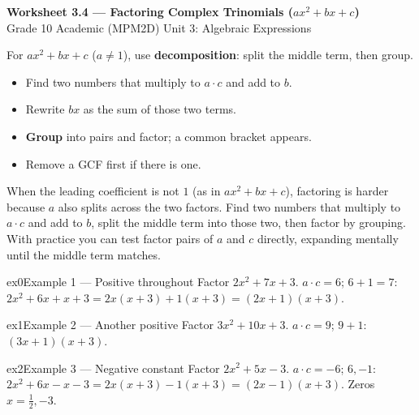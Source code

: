 \documentclass[11pt]{article}
\begin{document}
\begin{center}
{\LARGE\bfseries\color{titleblue}Worksheet 3.4 --- Factoring Complex Trinomials ($ax^2+bx+c$)}\\[2pt]
{\small Grade 10 Academic (MPM2D) \textperiodcentered{} Unit 3: Algebraic Expressions}
\end{center}

\begin{ideabox}
For $ax^2+bx+c$ ($a\neq1$), use \textbf{decomposition}: split the middle term, then group.
\begin{itemize}[leftmargin=*,itemsep=2pt]
  \item Find two numbers that multiply to $a\cdot c$ and add to $b$.
  \item Rewrite $bx$ as the sum of those two terms.
  \item \textbf{Group} into pairs and factor; a common bracket appears.
  \item Remove a GCF first if there is one.
\end{itemize}
\end{ideabox}

\begin{learnbox}
When the leading coefficient is not $1$ (as in $ax^2+bx+c$), factoring is harder because $a$ also splits across the two factors.
Find two numbers that multiply to $a\cdot c$ and add to $b$, split the middle term into those two, then factor by grouping.
With practice you can test factor pairs of $a$ and $c$ directly, expanding mentally until the middle term matches.
\end{learnbox}


\begin{example}{ex0}{Example 1 --- Positive throughout}
Factor $2x^2+7x+3$.
\soln $a\cdot c=6$; $6+1=7$: $2x^2+6x+x+3=2x(x+3)+1(x+3)=(2x+1)(x+3).$
\end{example}

\begin{example}{ex1}{Example 2 --- Another positive}
Factor $3x^2+10x+3$.
\soln $a\cdot c=9$; $9+1$: $(3x+1)(x+3).$
\end{example}

\begin{example}{ex2}{Example 3 --- Negative constant}
Factor $2x^2+5x-3$.
\soln $a\cdot c=-6$; $6,-1$: $2x^2+6x-x-3=2x(x+3)-1(x+3)=(2x-1)(x+3).$ Zeros $x=\tfrac12,-3$.
\end{example}
\end{document}
